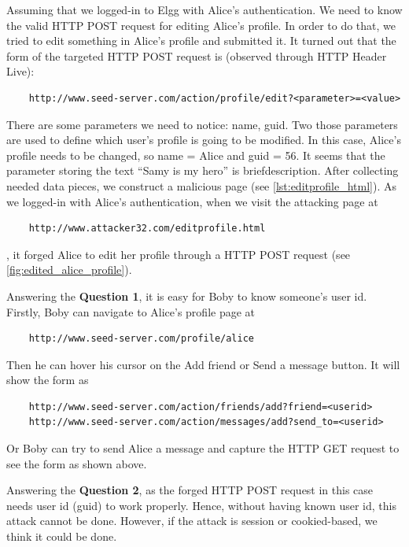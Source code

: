Assuming that we logged-in to Elgg with Alice's authentication. We need to know the valid
HTTP POST request for editing Alice's profile. In order to do that, we tried to edit something
in Alice's profile and submitted it. It turned out that the form of the targeted HTTP POST
request is (observed through HTTP Header Live):

\begin{verbatim}
    http://www.seed-server.com/action/profile/edit?<parameter>=<value>
\end{verbatim}

There are some parameters we need to notice: {\selectfont name,
guid}. Two those parameters are used to define which user's profile is going to
be modified. In this case, Alice's profile needs to be changed, so {\selectfont
name = Alice} and {\selectfont guid = 56}. It seems that the parameter
storing the text ``Samy is my hero'' is {\selectfont briefdescription}.
After collecting needed data pieces, we construct a malicious page (see \autoref{lst:editprofile_html}).
As we logged-in with Alice's authentication, when we visit the attacking page at

\begin{verbatim}
    http://www.attacker32.com/editprofile.html
\end{verbatim}

, it forged Alice to edit her profile through a HTTP POST request (see \autoref{fig:edited_alice_profile}).

Answering the \textbf{Question 1}, it is easy for Boby to know someone's user id. Firstly,
Boby can navigate to Alice's profile page at

\begin{verbatim}
    http://www.seed-server.com/profile/alice
\end{verbatim}

Then he can hover his cursor on the {\selectfont Add friend} or
{\selectfont Send a message} button. It will show the form as

\begin{verbatim}
    http://www.seed-server.com/action/friends/add?friend=<userid>
    http://www.seed-server.com/action/messages/add?send_to=<userid>
\end{verbatim}

Or Boby can try to send Alice a message and capture the HTTP GET request to see the form
as shown above.

Answering the \textbf{Question 2}, as the forged HTTP POST request in this case needs
user id (guid) to work properly. Hence, without having known user id, this attack cannot
be done. However, if the attack is session or cookied-based, we think it could be done.